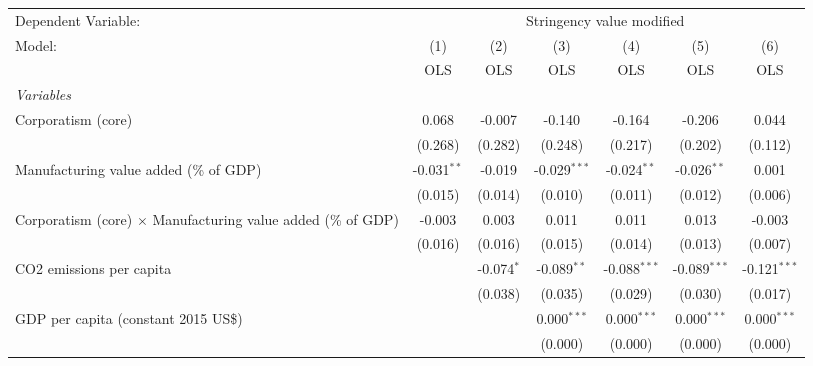 
\begingroup
\centering
\begin{tabular}{lcccccc}
   \toprule
   Dependent Variable: & \multicolumn{6}{c}{Stringency value modified}\\
   Model:                                                              & (1)           & (2)          & (3)            & (4)            & (5)            & (6)\\  
                                                                       &  OLS          & OLS          & OLS            & OLS            & OLS            & OLS\\  
   \midrule
   \emph{Variables}\\
   Corporatism (core)                                                  & 0.068         & -0.007       & -0.140         & -0.164         & -0.206         & 0.044\\   
                                                                       & (0.268)       & (0.282)      & (0.248)        & (0.217)        & (0.202)        & (0.112)\\   
   Manufacturing value added (\% of GDP)                               & -0.031$^{**}$ & -0.019       & -0.029$^{***}$ & -0.024$^{**}$  & -0.026$^{**}$  & 0.001\\   
                                                                       & (0.015)       & (0.014)      & (0.010)        & (0.011)        & (0.012)        & (0.006)\\   
   Corporatism (core) $\times$ Manufacturing value added (\% of GDP)   & -0.003        & 0.003        & 0.011          & 0.011          & 0.013          & -0.003\\   
                                                                       & (0.016)       & (0.016)      & (0.015)        & (0.014)        & (0.013)        & (0.007)\\   
   CO2 emissions per capita                                            &               & -0.074$^{*}$ & -0.089$^{**}$  & -0.088$^{***}$ & -0.089$^{***}$ & -0.121$^{***}$\\   
                                                                       &               & (0.038)      & (0.035)        & (0.029)        & (0.030)        & (0.017)\\   
   GDP per capita (constant 2015 US\$)                                 &               &              & 0.000$^{***}$  & 0.000$^{***}$  & 0.000$^{***}$  & 0.000$^{***}$\\   
                                                                       &               &              & (0.000)        & (0.000)        & (0.000)        & (0.000)\\   

\end{tabular}
